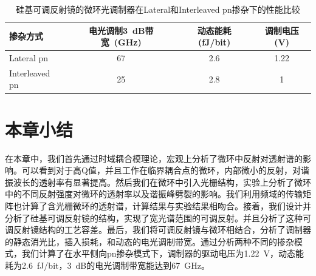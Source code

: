 {
	\begin{table}[htb]
		\caption{硅基可调反射镜的微环光调制器在Lateral和Interleaved pn掺杂下的性能比较}
		\label{lateral_interleaved}
		\centering
		\begin{tabular}[t]{p{4cm}ccc}
			\hline
			掺杂方式 &  电光调制3~dB带宽~(GHz) & 动态能耗 (fJ/bit) & 调制电压 (V)\\
			\hline
			Lateral pn & 67 &  2.6 & 1.22 \\
			Interleaved pn & 25 & 2.8 & 1 \\
			\hline
		\end{tabular}
	\end{table}
}

\section{本章小结}
在本章中，我们首先通过时域耦合模理论，宏观上分析了微环中反射对透射谱的影响。可以看到对于高Q值，并且工作在临界耦合点的微环，内部微小的反射，对谐振波长的透射率有显著提高。然后我们在微环中引入光栅结构，实验上分析了微环中的不同反射强度对微环的透射率以及谐振峰劈裂的影响。我们利用频域的传输矩阵也计算了含光栅微环的透射谱，计算结果与实验结果相吻合。接着，我们设计并分析了硅基可调反射镜的结构，实现了宽光谱范围的可调反射。并且分析了这种可调反射镜结构的工艺容差。最后，我们将可调反射镜与微环相结合，分析了调制器的静态消光比，插入损耗，和动态的电光调制带宽。通过分析两种不同的掺杂模式，我们计算了在水平侧向pn掺杂模式下，调制器的驱动电压为1.22~V，动态能耗为2.6~fJ/bit，3~dB的电光调制带宽能达到67~GHz。

